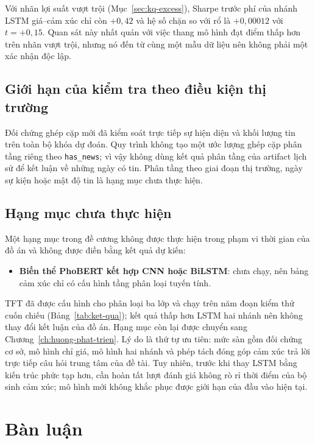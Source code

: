 Với nhãn lợi suất vượt trội (Mục~\ref{sec:kq-excess}), Sharpe trước phí của nhánh LSTM
giá--cảm xúc chỉ còn $+0{,}42$ và hệ số chặn so với rổ là $+0{,}00012$ với $t = +0{,}15$.
Quan sát này nhất quán với việc thang mô hình đạt điểm thấp hơn trên nhãn vượt trội, nhưng
nó đến từ cùng một mẫu dữ liệu nên không phải một xác nhận độc lập.


\subsection{Giới hạn của kiểm tra theo điều kiện thị trường}
\label{sec:kq-strat}

Đối chứng ghép cặp mới đã kiểm soát trực tiếp sự hiện diện và khối lượng tin trên toàn bộ
khóa dự đoán. Quy trình không tạo một ước lượng ghép cặp phân tầng riêng theo
\texttt{has\_news}; vì vậy không dùng kết quả phân tầng của artifact lịch sử để kết luận
về những ngày có tin. Phân tầng theo giai đoạn thị trường, ngày sự kiện hoặc mật độ tin là
hạng mục chưa thực hiện.

\subsection{Hạng mục chưa thực hiện}

Một hạng mục trong đề cương không được thực hiện trong phạm vi thời gian của đồ án và
không được điền bằng kết quả dự kiến:

\begin{itemize}[nosep]
  \item \textbf{Biến thể PhoBERT kết hợp CNN hoặc BiLSTM}: chưa chạy, nên bảng cảm xúc chỉ
        có cấu hình tầng phân loại tuyến tính.
\end{itemize}

TFT đã được cấu hình cho phân loại ba lớp và chạy trên năm đoạn kiểm thử cuốn chiếu
(Bảng~\ref{tab:ket-qua}); kết quả thấp hơn LSTM hai nhánh nên không thay đổi kết luận
của đồ án. Hạng mục còn lại được chuyển sang Chương~\ref{ch:huong-phat-trien}. Lý do là
thứ tự ưu tiên: mức sàn gồm đối chứng cơ sở, mô hình chỉ giá, mô hình hai nhánh và phép
tách đóng góp cảm xúc trả lời trực tiếp câu hỏi trung tâm của đề tài. Tuy nhiên, trước
khi thay LSTM bằng kiến trúc phức tạp hơn, cần hoàn tất lượt đánh giá không rò rỉ thời
điểm của bộ sinh cảm xúc; mô hình mới không khắc phục được giới hạn của đầu vào hiện tại.

\section{Bàn luận}
\label{sec:kq-ban-luan}

